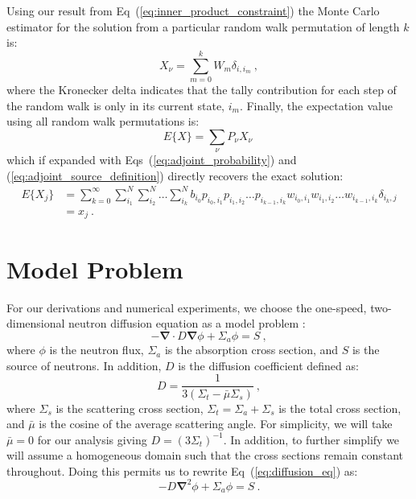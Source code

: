 \documentclass[preprint,11pt]{elsarticle}
\begin{document}
Using our result from Eq~(\ref{eq:inner_product_constraint}) the Monte Carlo
estimator for the solution from a particular random walk permutation of length
$k$ is:
\begin{equation}
  X_{\nu} = \sum_{m=0}^k W_{m} \delta_{i,i_m}\:,
  \label{eq:adjoint_permutation_contribution}
\end{equation}
where the Kronecker delta indicates that the tally contribution for each step
of the random walk is only in its current state, $i_m$. Finally, the
expectation value using all random walk permutations is:
\begin{equation}
  E\{X\} = \sum_{\nu} P_{\nu} X_{\nu}\:
  \label{eq:adjoint_expectation_value}
\end{equation}
which if expanded with Eqs~(\ref{eq:adjoint_probability}) and
(\ref{eq:adjoint_source_definition}) directly recovers the exact solution:
\begin{equation}
  \begin{split}
    E\{X_j\} &=\sum_{k=0}^{\infty}\sum_{i_1}^{N}\sum_{i_2}^{N}\ldots
    \sum_{i_k}^{N} b_{i_0} p_{i_0,i_1}p_{i_1,i_2}\ldots
    p_{i_{k-1},i_k} w_{i_0,i_1}w_{i_1,i_2}\ldots
    w_{i_{k-1},i_k} \delta_{i_k,j} \\ &= x_{j}\:.
  \end{split}
  \label{eq:adjoint_expectation_expansion}
\end{equation}

\section{Model Problem}
\label{sec:model_problem}

For our derivations and numerical experiments, we choose the one-speed,
two-dimensional neutron diffusion equation as a model problem
\cite{duderstadt_nuclear_1976}:
\begin{equation}
  -\boldsymbol{\nabla} \cdot D \boldsymbol{\nabla} \phi + \Sigma_a
  \phi = S\:,
  \label{eq:diffusion_eq}
\end{equation}
where $\phi$ is the neutron flux, $\Sigma_a$ is the absorption cross
section, and $S$ is the source of neutrons. In addition, $D$ is the
diffusion coefficient defined as:
\begin{equation}
  D = \frac{1}{3 ( \Sigma_t - \bar{\mu}\Sigma_s )}\:,
  \label{eq:diffusion_coeff}
\end{equation}
where $\Sigma_s$ is the scattering cross section, $\Sigma_t = \Sigma_a
+ \Sigma_s$ is the total cross section, and $\bar{\mu}$ is the cosine
of the average scattering angle. For simplicity, we will take
$\bar{\mu} = 0$ for our analysis giving $D=(3 \Sigma_t)^{-1}$. In
addition, to further simplify we will assume a homogeneous domain such
that the cross sections remain constant throughout. Doing this permits
us to rewrite Eq~(\ref{eq:diffusion_eq}) as:
\begin{equation}
  -D \boldsymbol{\nabla}^2 \phi + \Sigma_a \phi = S\:.
  \label{eq:diffusion_eq_simple}
\end{equation}
\end{document}
